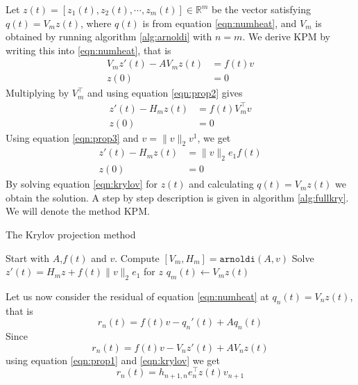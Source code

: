 Let $z(t) = [z_1(t), z_2(t), \cdots, z_m(t)] \in \mathbb{R}^m $ be the vector satisfying $q(t) = V_m z(t)$, where $q(t)$ is from equation \eqref{eqn:numheat}, and $V_m$ is obtained by running algorithm \ref{alg:arnoldi} with $n = m$. 
We derive KPM by writing this into \eqref{eqn:numheat}, that is
\begin{equation*}  \begin{aligned} \label{eqn:KPMtemp1}
V_m z'(t) - A V_m z(t) &= f(t) v \\
z(0)& = 0
\end{aligned} \end{equation*}
Multiplying by $V_m^{\top}$ and using equation \eqref{eqn:prop2} gives
\begin{equation*} 
\begin{aligned} \label{eqn:KPMtemp2}
z'(t)-H_m z(t) &= f(t) V_m^{\top}  v  \\
z(0)& = 0
\end{aligned}
\end{equation*}
Using equation \eqref{eqn:prop3} and $v = \|v \|_2 v^1 $, we get
\begin{equation} 
\begin{aligned} \label{eqn:krylov}
z'(t) -H_m z(t) &=  \|v \|_2 e_1 f(t)\\
z(0)& = 0
\end{aligned}
\end{equation}
By solving equation \eqref{eqn:krylov} for $z(t)$ and calculating $ q(t) = V_m z(t) $ we obtain the solution. A step by step description is given in algorithm \ref{alg:fullkry}. 
 We will denote the method KPM.\\
\begin{algorithm}
\begin{algorithmic} \caption{The Krylov projection method} \label{alg:fullkry} 
\STATE Start with $A$,$f(t)$ and $v$.
\STATE Compute $[V_m ,H_m] = \texttt{arnoldi}(A,v)$
\STATE Solve $  z'(t) = H_m z + f(t) \| v \|_2 e_1  $ for $z$
\STATE $ q_m (t) \leftarrow  V_m z(t) $
\end{algorithmic} 
\end{algorithm}

Let us now consider the residual of equation \eqref{eqn:numheat} at $q_n(t) = V_n z (t)$, that is
\begin{equation*}
r_n(t) = f(t) v - q_n'(t) +Aq_n(t)
\end{equation*}
Since
\begin{equation*}
r_n(t) = f(t)v -V_n z'(t) + A V_n z(t)
\end{equation*}
using equation \eqref{eqn:prop1} and \eqref{eqn:krylov} we get
\begin{equation} \label{eqn:rn}
r_n(t) = h_{n+1,n}e_n^\top z(t) v_{n+1}
\end{equation}

